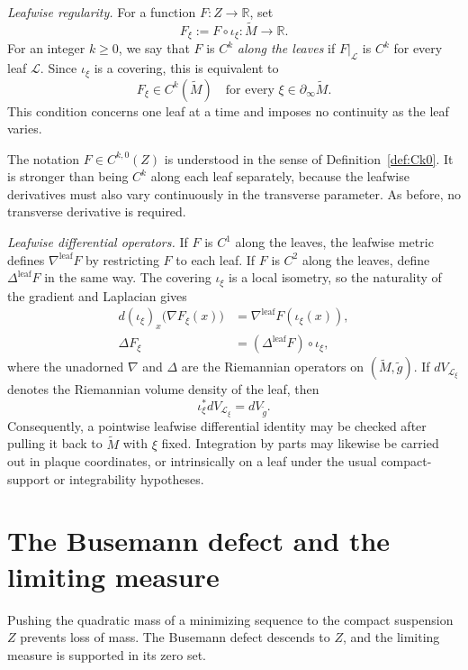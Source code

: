 \documentclass[12pt]{amsart}
\theoremstyle{definition}
\numberwithin{equation}{section}
\newcommand{\mc}{\mathcal}
\newcommand{\wti}{\widetilde}
\begin{document}
\smallskip
\noindent\emph{Leafwise regularity.}
For a function \(F\colon Z\to\mathbb R\), set
\[
  F_\xi:=F\circ\iota_\xi\colon\wti M\longrightarrow\mathbb R.
\]
For an integer \(k\geq0\), we say that \(F\) is \(C^k\)
\emph{along the leaves} if \(F|_{\mc L}\) is \(C^k\) for every leaf
\(\mc L\).  Since \(\iota_\xi\) is a covering, this is equivalent to
\[
  F_\xi\in C^k(\wti M)
  \quad
  \text{for every }\xi\in\partial_\infty\wti M.
\]
This condition concerns one leaf at a time and imposes no continuity as
the leaf varies.

The notation \(F\in C^{k,0}(Z)\) is understood in the sense of
Definition~\ref{def:Ck0}.  It is stronger than being \(C^k\) along
each leaf separately, because the leafwise derivatives must also vary
continuously in the transverse parameter.  As before, no transverse
derivative is required.

\smallskip
\noindent\emph{Leafwise differential operators.}
If \(F\) is \(C^1\) along the leaves, the leafwise metric defines
\(\nabla^{\mathrm{leaf}}F\) by restricting \(F\) to each leaf.  If
\(F\) is \(C^2\) along the leaves, define
\(\Delta^{\mathrm{leaf}}F\) in the same way.  The covering
\(\iota_\xi\) is a local isometry, so the naturality of the gradient and
Laplacian gives
\begin{equation}\label{eq:leafwise-lift-calculus}
\begin{aligned}
  d(\iota_\xi)_x\bigl(\nabla F_\xi(x)\bigr)
  &=\nabla^{\mathrm{leaf}}F(\iota_\xi(x)),\\
  \Delta F_\xi
  &=(\Delta^{\mathrm{leaf}}F)\circ\iota_\xi,
\end{aligned}
\end{equation}
where the unadorned \(\nabla\) and \(\Delta\) are the Riemannian operators on
\((\wti M,\wti g)\).  If \(dV_{\mc L_\xi}\) denotes the Riemannian
volume density of the leaf, then
\[
  \iota_\xi^*dV_{\mc L_\xi}=dV_{\wti g}.
\]
Consequently, a pointwise leafwise differential identity may be checked
after pulling it back to \(\wti M\) with \(\xi\) fixed.  Integration by
parts may likewise be carried out in plaque coordinates, or intrinsically
on a leaf under the usual compact-support or integrability hypotheses.

\section{The Busemann defect and the limiting measure}
\label{sec:limiting-measure}

Pushing the quadratic mass of a minimizing sequence to the compact
suspension \(Z\) prevents loss of mass.  The Busemann defect descends to
\(Z\), and the limiting measure is supported in its zero set.
\end{document}
